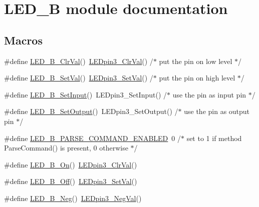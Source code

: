 \hypertarget{group___l_e_d___b__module}{}\section{L\+E\+D\+\_\+B module documentation}
\label{group___l_e_d___b__module}
\subsection*{Macros}
\begin{DoxyCompactItemize}
\item 
\#define \hyperlink{group___l_e_d___b__module_gaea0844172b02a5aa5a6866bbbafaf54b}{L\+E\+D\+\_\+\+B\+\_\+\+Clr\+Val}()~\hyperlink{group___l_e_dpin3__module_ga4a1dbfa4a99a042a095f0e4c9f192f52}{L\+E\+Dpin3\+\_\+\+Clr\+Val}() /$\ast$ put the pin on low level $\ast$/
\item 
\#define \hyperlink{group___l_e_d___b__module_gaf7c108fedb0357b1bebf6cbf56e7989f}{L\+E\+D\+\_\+\+B\+\_\+\+Set\+Val}()~\hyperlink{group___l_e_dpin3__module_ga87f26e16b11b83e9eb6b26b08bc276ad}{L\+E\+Dpin3\+\_\+\+Set\+Val}() /$\ast$ put the pin on high level $\ast$/
\item 
\#define \hyperlink{group___l_e_d___b__module_ga6482fe82577a304cbace38e7dfe6f54a}{L\+E\+D\+\_\+\+B\+\_\+\+Set\+Input}()~L\+E\+Dpin3\+\_\+\+Set\+Input() /$\ast$ use the pin as input pin $\ast$/
\item 
\#define \hyperlink{group___l_e_d___b__module_gabcdfe22c01cd4545fee55c1855125a40}{L\+E\+D\+\_\+\+B\+\_\+\+Set\+Output}()~L\+E\+Dpin3\+\_\+\+Set\+Output() /$\ast$ use the pin as output pin $\ast$/
\item 
\#define \hyperlink{group___l_e_d___b__module_ga8faf96e73dea44b9fef6476fe5478ab4}{L\+E\+D\+\_\+\+B\+\_\+\+P\+A\+R\+S\+E\+\_\+\+C\+O\+M\+M\+A\+N\+D\+\_\+\+E\+N\+A\+B\+L\+ED}~0 /$\ast$ set to 1 if method Parse\+Command() is present, 0 otherwise $\ast$/
\item 
\#define \hyperlink{group___l_e_d___b__module_gac6832625f88e33df89031f708d6002b4}{L\+E\+D\+\_\+\+B\+\_\+\+On}()~\hyperlink{group___l_e_dpin3__module_ga4a1dbfa4a99a042a095f0e4c9f192f52}{L\+E\+Dpin3\+\_\+\+Clr\+Val}()
\item 
\#define \hyperlink{group___l_e_d___b__module_gac0f54506e1940c3cd88c1f653f2554a4}{L\+E\+D\+\_\+\+B\+\_\+\+Off}()~\hyperlink{group___l_e_dpin3__module_ga87f26e16b11b83e9eb6b26b08bc276ad}{L\+E\+Dpin3\+\_\+\+Set\+Val}()
\item 
\#define \hyperlink{group___l_e_d___b__module_gac8cd508e7d4e7a5cea096882ef18f542}{L\+E\+D\+\_\+\+B\+\_\+\+Neg}()~\hyperlink{group___l_e_dpin3__module_ga7b7480d673eb2347ba54b6d7c93313aa}{L\+E\+Dpin3\+\_\+\+Neg\+Val}()

\end{DoxyCompactItemize}
